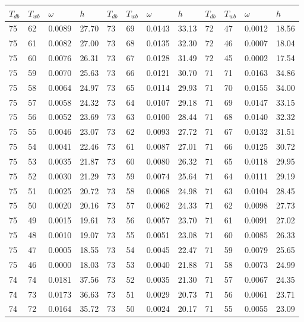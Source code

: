 \begin{tabular}{llll|llll|llll}
 \toprule 
\(T_{db}\) & \(T_{wb}\) & \(\omega\) & \(h\) & \(T_{db}\) & \(T_{wb}\) & \(\omega\) & \(h\) & \(T_{db}\) & \(T_{wb}\) & \(\omega\) & \(h\)  \\ \midrule 
75 & 62 & 0.0089 & 27.70 & 73 & 69 & 0.0143 & 33.13 & 72 & 47 & 0.0012 & 18.56\\
75 & 61 & 0.0082 & 27.00 & 73 & 68 & 0.0135 & 32.30 & 72 & 46 & 0.0007 & 18.04\\
75 & 60 & 0.0076 & 26.31 & 73 & 67 & 0.0128 & 31.49 & 72 & 45 & 0.0002 & 17.54\\
75 & 59 & 0.0070 & 25.63 & 73 & 66 & 0.0121 & 30.70 & 71 & 71 & 0.0163 & 34.86\\
75 & 58 & 0.0064 & 24.97 & 73 & 65 & 0.0114 & 29.93 & 71 & 70 & 0.0155 & 34.00\\
75 & 57 & 0.0058 & 24.32 & 73 & 64 & 0.0107 & 29.18 & 71 & 69 & 0.0147 & 33.15\\
75 & 56 & 0.0052 & 23.69 & 73 & 63 & 0.0100 & 28.44 & 71 & 68 & 0.0140 & 32.32\\
75 & 55 & 0.0046 & 23.07 & 73 & 62 & 0.0093 & 27.72 & 71 & 67 & 0.0132 & 31.51\\
75 & 54 & 0.0041 & 22.46 & 73 & 61 & 0.0087 & 27.01 & 71 & 66 & 0.0125 & 30.72\\
75 & 53 & 0.0035 & 21.87 & 73 & 60 & 0.0080 & 26.32 & 71 & 65 & 0.0118 & 29.95\\
75 & 52 & 0.0030 & 21.29 & 73 & 59 & 0.0074 & 25.64 & 71 & 64 & 0.0111 & 29.19\\
75 & 51 & 0.0025 & 20.72 & 73 & 58 & 0.0068 & 24.98 & 71 & 63 & 0.0104 & 28.45\\
75 & 50 & 0.0020 & 20.16 & 73 & 57 & 0.0062 & 24.33 & 71 & 62 & 0.0098 & 27.73\\
75 & 49 & 0.0015 & 19.61 & 73 & 56 & 0.0057 & 23.70 & 71 & 61 & 0.0091 & 27.02\\
75 & 48 & 0.0010 & 19.07 & 73 & 55 & 0.0051 & 23.08 & 71 & 60 & 0.0085 & 26.33\\
75 & 47 & 0.0005 & 18.55 & 73 & 54 & 0.0045 & 22.47 & 71 & 59 & 0.0079 & 25.65\\
75 & 46 & 0.0000 & 18.03 & 73 & 53 & 0.0040 & 21.88 & 71 & 58 & 0.0073 & 24.99\\
74 & 74 & 0.0181 & 37.56 & 73 & 52 & 0.0035 & 21.30 & 71 & 57 & 0.0067 & 24.35\\
74 & 73 & 0.0173 & 36.63 & 73 & 51 & 0.0029 & 20.73 & 71 & 56 & 0.0061 & 23.71\\
74 & 72 & 0.0164 & 35.72 & 73 & 50 & 0.0024 & 20.17 & 71 & 55 & 0.0055 & 23.09\\

\end{tabular}
